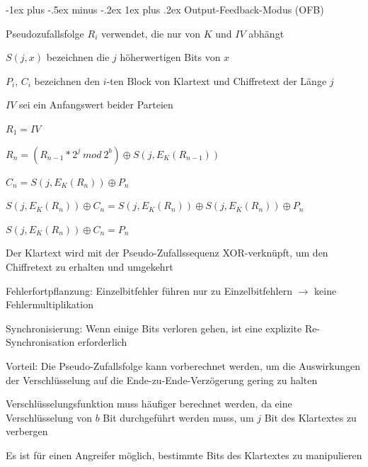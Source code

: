 \documentclass[a4paper]{article}
\makeatletter
\renewcommand{\subsubsection}{\@startsection{subsubsection}{3}{0mm}%
 {-1ex plus -.5ex minus -.2ex}%
 {1ex plus .2ex}%
 {\normalfont\small\bfseries}}
\makeatother
\begin{document}
\begin{multicols}{3}
      \subsubsection{Output-Feedback-Modus (OFB)}
      \begin{itemize*}
            \item Pseudozufallsfolge $R_i$ verwendet, die nur von $K$ und $IV$ abhängt
            \begin{itemize*}
                  \item $S(j, x)$ bezeichnen die $j$ höherwertigen Bits von $x$
                  \item $P_i$, $C_i$ bezeichnen den $i$-ten Block von Klartext und Chiffretext der Länge $j$
                  \item $IV$ sei ein Anfangswert beider Parteien
                  \item $R_1 = IV$
                  \item $R_n = (R_{n-1}* 2^j\ mod\ 2^b )\oplus S(j,E_K(R_{n-1}))$ %
                  \item $C_n = S(j,E_K(R_n))\oplus P_n$
                  \item $S(j,E_K(R_n))\oplus C_n = S(j,E_K(R_n))\oplus S(j,E_K(R_n))\oplus P_n$
                  \item $S(j,E_K(R_n))\oplus C_n = P_n$
            \end{itemize*}
            \item Der Klartext wird mit der Pseudo-Zufallssequenz XOR-verknüpft, um den Chiffretext zu erhalten und umgekehrt
            \item Fehlerfortpflanzung: Einzelbitfehler führen nur zu Einzelbitfehlern $\rightarrow$ keine Fehlermultiplikation
            \item Synchronisierung: Wenn einige Bits verloren gehen, ist eine explizite Re-Synchronisation erforderlich
            \item Vorteil: Die Pseudo-Zufallsfolge kann vorberechnet werden, um die Auswirkungen der Verschlüsselung auf die Ende-zu-Ende-Verzögerung gering zu halten
            \item Verschlüsselungsfunktion muss häufiger berechnet werden, da eine Verschlüsselung von $b$ Bit durchgeführt werden muss, um $j$ Bit des Klartextes zu verbergen
            \item Es ist für einen Angreifer möglich, bestimmte Bits des Klartextes zu manipulieren
      \end{itemize*}

\end{multicols}
\end{document}
